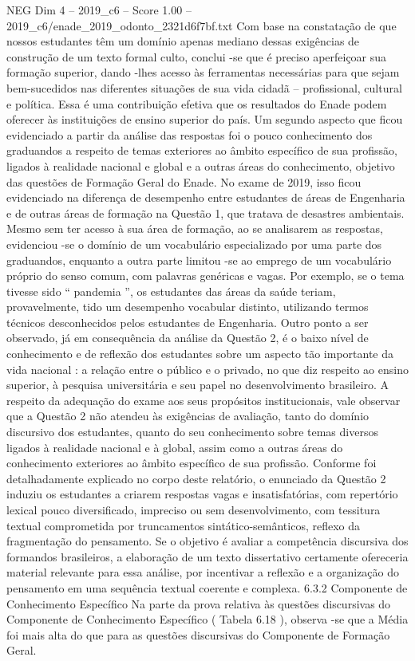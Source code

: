 \begin{textsample}{NEG Dim 4 – 2019\_c6 – Score 1.00 – 2019\_c6/enade\_2019\_odonto\_2321d6f7bf.txt}
Com base na constatação de que nossos estudantes têm um domínio apenas mediano dessas exigências de construção de um texto formal culto, conclui -se que é preciso aperfeiçoar sua formação superior, dando -lhes acesso às ferramentas necessárias para que sejam bem-sucedidos nas diferentes situações de sua vida cidadã – profissional, cultural e política.
Essa é uma contribuição efetiva que os resultados do Enade podem oferecer às instituições de ensino superior do país.
Um segundo aspecto que ficou evidenciado a partir da análise das respostas foi o pouco conhecimento dos graduandos a respeito de temas exteriores ao âmbito específico de sua profissão, ligados à realidade nacional e global e a outras áreas do conhecimento, objetivo das questões de Formação Geral do Enade.
No exame de 2019, isso ficou evidenciado na diferença de desempenho entre estudantes de áreas de Engenharia e de outras áreas de formação na Questão 1, que tratava de desastres ambientais.
Mesmo sem ter acesso à sua área de formação, ao se analisarem as respostas, evidenciou -se o domínio de um vocabulário especializado por uma parte dos graduandos, enquanto a outra parte limitou -se ao emprego de um vocabulário próprio do senso comum, com palavras genéricas e vagas.
Por exemplo, se o tema tivesse sido “ pandemia ”, os estudantes das áreas da saúde teriam, provavelmente, tido um desempenho vocabular distinto, utilizando termos técnicos desconhecidos pelos estudantes de Engenharia.
Outro ponto a ser observado, já em consequência da análise da Questão 2, é o baixo nível de conhecimento e de reflexão dos estudantes sobre um aspecto tão importante da vida nacional : a relação entre o público e o privado, no que diz respeito ao ensino superior, à pesquisa universitária e seu papel no desenvolvimento brasileiro.
A respeito da adequação do exame aos seus propósitos institucionais, vale observar que a Questão 2 não atendeu às exigências de avaliação, tanto do domínio discursivo dos estudantes, quanto do seu conhecimento sobre temas diversos ligados à realidade nacional e à global, assim como a outras áreas do conhecimento exteriores ao âmbito específico de sua profissão.
Conforme foi detalhadamente explicado no corpo deste relatório, o enunciado da Questão 2 induziu os estudantes a criarem respostas vagas e insatisfatórias, com repertório lexical pouco diversificado, impreciso ou sem desenvolvimento, com tessitura textual comprometida por truncamentos sintático-semânticos, reflexo da fragmentação do pensamento.
Se o objetivo é avaliar a competência discursiva dos formandos brasileiros, a elaboração de um texto dissertativo certamente ofereceria material relevante para essa análise, por incentivar a reflexão e a organização do pensamento em uma sequência textual coerente e complexa. 6.3.2 Componente de Conhecimento Específico Na parte da prova relativa às questões discursivas do Componente de Conhecimento Específico ( Tabela 6.18 ), observa -se que a Média foi mais alta do que para as questões discursivas do Componente de Formação Geral.

\end{textsample}
